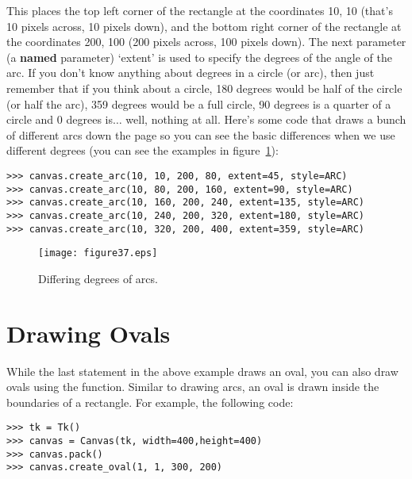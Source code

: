 This places the top left corner of the rectangle at the coordinates 10, 10 (that's 10 pixels across, 10 pixels down), and the bottom right corner of the rectangle at the coordinates 200, 100 (200 pixels across, 100 pixels down).  The next parameter (a \textbf{named} parameter) `extent' is used to specify the degrees of the angle of the arc.  If you don't know anything about degrees in a circle (or arc), then just remember that if you think about a circle, 180 degrees would be half of the circle (or half the arc), 359 degrees would be a full circle, 90 degrees is a quarter of a circle and 0 degrees is$\ldots$ well, nothing at all. Here's some code that draws a bunch of different arcs down the page so you can see the basic differences when we use different degrees (you can see the examples in figure~\ref{fig37}):

\begin{listing}
\begin{verbatim}
>>> canvas.create_arc(10, 10, 200, 80, extent=45, style=ARC)
>>> canvas.create_arc(10, 80, 200, 160, extent=90, style=ARC)
>>> canvas.create_arc(10, 160, 200, 240, extent=135, style=ARC)
>>> canvas.create_arc(10, 240, 200, 320, extent=180, style=ARC)
>>> canvas.create_arc(10, 320, 200, 400, extent=359, style=ARC)
\end{verbatim}
\end{listing}

\begin{figure}
\begin{center}
\texttt{[image: figure37.eps]}
\end{center}
\caption{Differing degrees of arcs.}\label{fig37}
\end{figure}

\section{Drawing Ovals}

While the last statement in the above example draws an oval, you can also draw ovals using the  function.  Similar to drawing arcs, an oval is drawn inside the boundaries of a rectangle. For example, the following code:

\begin{listing}
\begin{verbatim}
>>> tk = Tk()
>>> canvas = Canvas(tk, width=400,height=400)
>>> canvas.pack()
>>> canvas.create_oval(1, 1, 300, 200)
\end{verbatim}
\end{listing}


